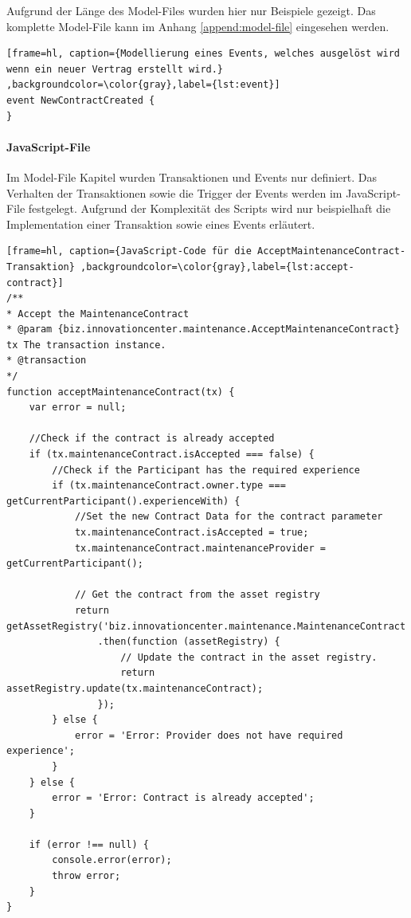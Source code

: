 Aufgrund der Länge des Model-Files wurden hier nur Beispiele gezeigt. Das komplette Model-File kann im Anhang \ref{append:model-file} eingesehen werden.

\begin{lstfloat}
\begin{lstlisting}[frame=hl, caption={Modellierung eines Events, welches ausgelöst wird wenn ein neuer Vertrag erstellt wird.} ,backgroundcolor=\color{gray},label={lst:event}]
event NewContractCreated {
}
\end{lstlisting} 
\end{lstfloat}

\paragraph{JavaScript-File}
Im Model-File Kapitel wurden Transaktionen und Events nur definiert. Das Verhalten der Transaktionen sowie die Trigger der Events werden im JavaScript-File festgelegt. Aufgrund der Komplexität des Scripts wird nur beispielhaft die Implementation einer Transaktion sowie eines Events erläutert.

\begin{lstfloat}
\begin{lstlisting}[frame=hl, caption={JavaScript-Code für die AcceptMaintenanceContract-Transaktion} ,backgroundcolor=\color{gray},label={lst:accept-contract}]
/**
* Accept the MaintenanceContract
* @param {biz.innovationcenter.maintenance.AcceptMaintenanceContract} tx The transaction instance.
* @transaction
*/
function acceptMaintenanceContract(tx) {
    var error = null;

    //Check if the contract is already accepted
    if (tx.maintenanceContract.isAccepted === false) {
        //Check if the Participant has the required experience
        if (tx.maintenanceContract.owner.type === getCurrentParticipant().experienceWith) {
            //Set the new Contract Data for the contract parameter
            tx.maintenanceContract.isAccepted = true;
            tx.maintenanceContract.maintenanceProvider = getCurrentParticipant();

            // Get the contract from the asset registry
            return getAssetRegistry('biz.innovationcenter.maintenance.MaintenanceContract')
                .then(function (assetRegistry) {
                    // Update the contract in the asset registry.
                    return assetRegistry.update(tx.maintenanceContract);
                });
        } else {
            error = 'Error: Provider does not have required experience';
        }
    } else {
        error = 'Error: Contract is already accepted';
    }

    if (error !== null) {
        console.error(error);
        throw error;
    }
}
\end{lstlisting} 
\end{lstfloat}


